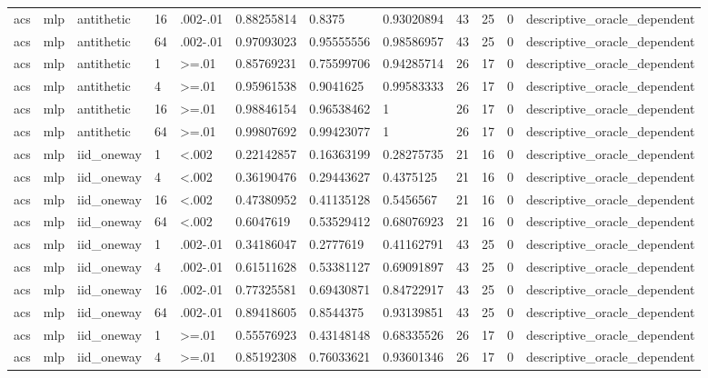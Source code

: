 \begin{tabular}{llllllllllll}
acs & mlp & antithetic & 16 & .002-.01 & 0.88255814 & 0.8375 & 0.93020894 & 43 & 25 & 0 & descriptive\_oracle\_dependent \\
acs & mlp & antithetic & 64 & .002-.01 & 0.97093023 & 0.95555556 & 0.98586957 & 43 & 25 & 0 & descriptive\_oracle\_dependent \\
acs & mlp & antithetic & 1 & >=.01 & 0.85769231 & 0.75599706 & 0.94285714 & 26 & 17 & 0 & descriptive\_oracle\_dependent \\
acs & mlp & antithetic & 4 & >=.01 & 0.95961538 & 0.9041625 & 0.99583333 & 26 & 17 & 0 & descriptive\_oracle\_dependent \\
acs & mlp & antithetic & 16 & >=.01 & 0.98846154 & 0.96538462 & 1 & 26 & 17 & 0 & descriptive\_oracle\_dependent \\
acs & mlp & antithetic & 64 & >=.01 & 0.99807692 & 0.99423077 & 1 & 26 & 17 & 0 & descriptive\_oracle\_dependent \\
acs & mlp & iid\_oneway & 1 & <.002 & 0.22142857 & 0.16363199 & 0.28275735 & 21 & 16 & 0 & descriptive\_oracle\_dependent \\
acs & mlp & iid\_oneway & 4 & <.002 & 0.36190476 & 0.29443627 & 0.4375125 & 21 & 16 & 0 & descriptive\_oracle\_dependent \\
acs & mlp & iid\_oneway & 16 & <.002 & 0.47380952 & 0.41135128 & 0.5456567 & 21 & 16 & 0 & descriptive\_oracle\_dependent \\
acs & mlp & iid\_oneway & 64 & <.002 & 0.6047619 & 0.53529412 & 0.68076923 & 21 & 16 & 0 & descriptive\_oracle\_dependent \\
acs & mlp & iid\_oneway & 1 & .002-.01 & 0.34186047 & 0.2777619 & 0.41162791 & 43 & 25 & 0 & descriptive\_oracle\_dependent \\
acs & mlp & iid\_oneway & 4 & .002-.01 & 0.61511628 & 0.53381127 & 0.69091897 & 43 & 25 & 0 & descriptive\_oracle\_dependent \\
acs & mlp & iid\_oneway & 16 & .002-.01 & 0.77325581 & 0.69430871 & 0.84722917 & 43 & 25 & 0 & descriptive\_oracle\_dependent \\
acs & mlp & iid\_oneway & 64 & .002-.01 & 0.89418605 & 0.8544375 & 0.93139851 & 43 & 25 & 0 & descriptive\_oracle\_dependent \\
acs & mlp & iid\_oneway & 1 & >=.01 & 0.55576923 & 0.43148148 & 0.68335526 & 26 & 17 & 0 & descriptive\_oracle\_dependent \\
acs & mlp & iid\_oneway & 4 & >=.01 & 0.85192308 & 0.76033621 & 0.93601346 & 26 & 17 & 0 & descriptive\_oracle\_dependent \\

\end{tabular}
